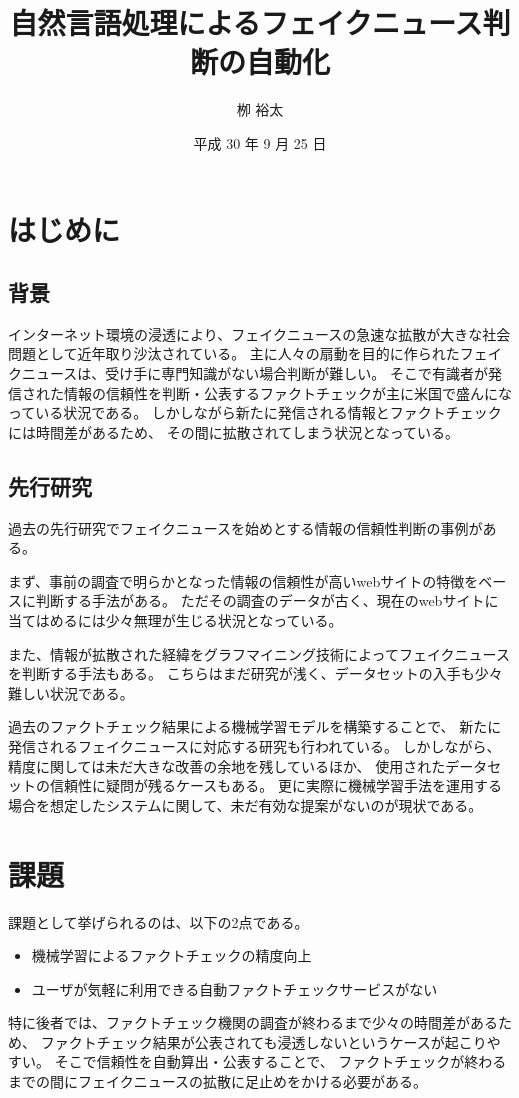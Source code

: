 \documentclass[twocolumn, a4paper, uplatex]{UECIEresume}
\title{自然言語処理によるフェイクニュース判断の自動化}
\date{平成 30 年 9 月 25 日}
\affiliation{総合情報学科 メディア情報学 コース}
\author{栁 裕太}
\begin{document}
\maketitle

\section{はじめに}
\subsection{背景}
インターネット環境の浸透により、フェイクニュースの急速な拡散が大きな社会問題として近年取り沙汰されている。
主に人々の扇動を目的に作られたフェイクニュースは、受け手に専門知識がない場合判断が難しい。
そこで有識者が発信された情報の信頼性を判断・公表するファクトチェックが主に米国で盛んになっている状況である。
しかしながら新たに発信される情報とファクトチェックには時間差があるため、
その間に拡散されてしまう状況となっている。

\subsection{先行研究}
過去の先行研究でフェイクニュースを始めとする情報の信頼性判断の事例がある。

まず、事前の調査で明らかとなった情報の信頼性が高いwebサイトの特徴をベースに判断する手法\cite{fuk}がある。
ただその調査のデータが古く、現在のwebサイトに当てはめるには少々無理が生じる状況となっている。

また、情報が拡散された経緯をグラフマイニング技術によってフェイクニュースを判断する手法\cite{foot}もある。
こちらはまだ研究が浅く、データセットの入手も少々難しい状況である。

過去のファクトチェック結果による機械学習モデルを構築することで、
新たに発信されるフェイクニュースに対応する研究も行われている\cite{nb}\cite{gilda}\cite{uec}。
しかしながら、精度に関しては未だ大きな改善の余地を残しているほか、
使用されたデータセットの信頼性に疑問が残るケースもある。
更に実際に機械学習手法を運用する場合を想定したシステムに関して、未だ有効な提案がないのが現状である。

\section{課題}
課題として挙げられるのは、以下の2点である。
\begin{itemize}
  \item 機械学習によるファクトチェックの精度向上
  \item ユーザが気軽に利用できる自動ファクトチェックサービスがない
\end{itemize}
特に後者では、ファクトチェック機関の調査が終わるまで少々の時間差があるため、
ファクトチェック結果が公表されても浸透しないというケースが起こりやすい。
そこで信頼性を自動算出・公表することで、
ファクトチェックが終わるまでの間にフェイクニュースの拡散に足止めをかける必要がある。
\end{document}
